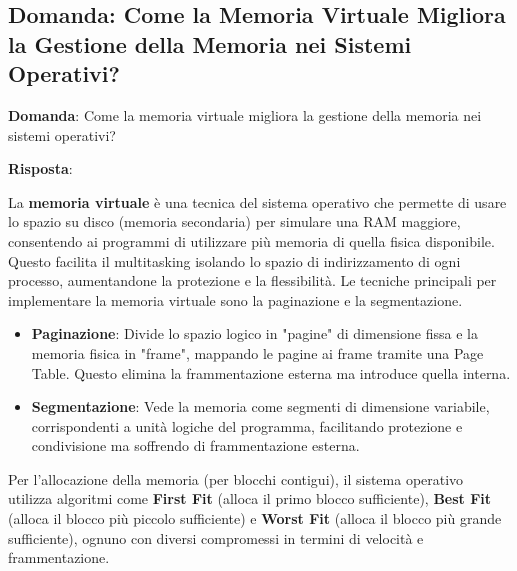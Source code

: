 
\subsection*{Domanda: Come la Memoria Virtuale Migliora la Gestione della Memoria nei Sistemi Operativi?}

\textbf{Domanda}: Come la memoria virtuale migliora la gestione della memoria nei sistemi operativi?

\textbf{Risposta}:

La \textbf{memoria virtuale} è una tecnica del sistema operativo che permette di usare lo spazio su disco (memoria secondaria) per simulare una RAM maggiore, consentendo ai programmi di utilizzare più memoria di quella fisica disponibile. Questo facilita il multitasking isolando lo spazio di indirizzamento di ogni processo, aumentandone la protezione e la flessibilità. Le tecniche principali per implementare la memoria virtuale sono la paginazione e la segmentazione.
\begin{itemize}
    \item \textbf{Paginazione}: Divide lo spazio logico in "pagine" di dimensione fissa e la memoria fisica in "frame", mappando le pagine ai frame tramite una Page Table. Questo elimina la frammentazione esterna ma introduce quella interna.
    \item \textbf{Segmentazione}: Vede la memoria come segmenti di dimensione variabile, corrispondenti a unità logiche del programma, facilitando protezione e condivisione ma soffrendo di frammentazione esterna.
\end{itemize}
Per l'allocazione della memoria (per blocchi contigui), il sistema operativo utilizza algoritmi come \textbf{First Fit} (alloca il primo blocco sufficiente), \textbf{Best Fit} (alloca il blocco più piccolo sufficiente) e \textbf{Worst Fit} (alloca il blocco più grande sufficiente), ognuno con diversi compromessi in termini di velocità e frammentazione.